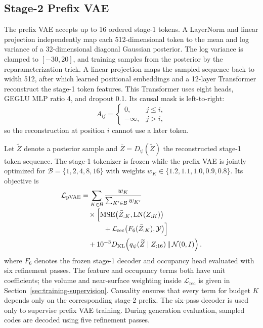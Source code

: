 \subsection{Stage-2 Prefix VAE}

The prefix VAE accepts up to 16 ordered stage-1 tokens.  A LayerNorm and linear
projection independently map each 512-dimensional token to the mean and log
variance of a 32-dimensional diagonal Gaussian posterior.  The log variance is
clamped to $[-30,20]$, and training samples from the posterior by the
reparameterization trick.  A linear projection maps the sampled sequence back
to width 512, after which learned positional embeddings and a 12-layer
Transformer reconstruct the stage-1 token features.  This Transformer uses
eight heads, GEGLU MLP ratio 4, and dropout 0.1.  Its causal mask is
left-to-right:
\begin{equation}
A_{ij}=\begin{cases}
0, & j\leq i,\\
-\infty, & j>i,
\end{cases}
\end{equation}
so the reconstruction at position $i$ cannot use a later token.

Let $\widetilde Z$ denote a posterior sample and
$\bar Z=D_{\psi}(\widetilde Z)$ the reconstructed stage-1 token sequence.  The
stage-1 tokenizer is frozen while the prefix VAE is jointly optimized for
$\mathcal{B}=\{1,2,4,8,16\}$ with weights
$w_K\in\{1.2,1.1,1.0,0.9,0.8\}$.  Its objective is
\begin{equation}
\begin{aligned}
\mathcal{L}_{\mathrm{pVAE}}
&=\sum_{K\in\mathcal{B}}
\frac{w_K}{\sum_{K'\in\mathcal{B}}w_{K'}}
\\[-0.2em]
&\quad\times\Bigl[
\operatorname{MSE}\!\left(\bar Z_{:K},\operatorname{LN}(Z_{:K})\right)
\\[-0.2em]
&\hspace{3.2em}
+\mathcal{L}_{\mathrm{rec}}\!\left(F_6(\bar Z_{:K}),\mathcal{Y}\right)
\Bigr]
\\
&\quad+10^{-3}D_{\mathrm{KL}}\!\left(
q_{\psi}(\widetilde Z\mid Z_{:16})\,\|\,\mathcal{N}(0,I)
\right).
\end{aligned}
\end{equation}
where $F_6$ denotes the frozen stage-1 decoder and occupancy head evaluated
with six refinement passes.  The feature and occupancy terms both have unit
coefficients; the volume and near-surface weighting inside
$\mathcal{L}_{\mathrm{rec}}$ is given in
Section~\ref{sec:training-supervision}.
Causality ensures that every term for budget $K$ depends only on the
corresponding stage-2 prefix. The six-pass decoder is used only to supervise
prefix VAE training. During generation evaluation, sampled codes are decoded
using five refinement passes.

